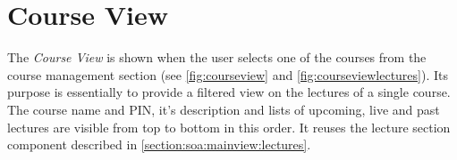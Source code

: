 \section{Course View}
\label{section:soa:courseview}

The \emph{Course View} is shown when the user selects one of the courses from the course management section (see \autoref{fig:courseview} and \autoref{fig:courseviewlectures}). Its purpose is essentially to provide a filtered view on the lectures of a single course.
The course name and PIN, it's description and lists of upcoming, live and past lectures are visible from top to bottom in this order. It reuses the lecture section component described in \autoref{section:soa:mainview:lectures}.

\begin{figure}
	\centering
	\begin{minipage}[t]{.5\textwidth}
		\centering

\end{minipage}
\end{figure}
